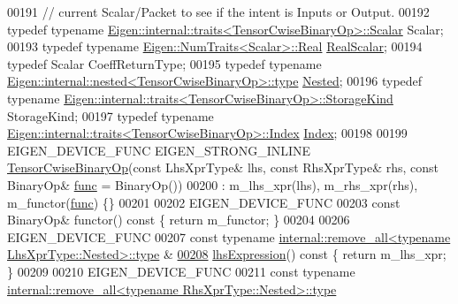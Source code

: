 \begin{DoxyCode}
00191     \textcolor{comment}{// current Scalar/Packet to see if the intent is Inputs or Output.}
00192     \textcolor{keyword}{typedef} \textcolor{keyword}{typename} \hyperlink{struct_eigen_1_1internal_1_1traits}{Eigen::internal::traits<TensorCwiseBinaryOp>::Scalar}
       Scalar;
00193     \textcolor{keyword}{typedef} \textcolor{keyword}{typename} \hyperlink{group___sparse_core___module}{Eigen::NumTraits<Scalar>::Real} 
      \hyperlink{group___sparse_core___module}{RealScalar};
00194     \textcolor{keyword}{typedef} Scalar CoeffReturnType;
00195     \textcolor{keyword}{typedef} \textcolor{keyword}{typename} \hyperlink{class_eigen_1_1internal_1_1_tensor_lazy_evaluator_writable}{Eigen::internal::nested<TensorCwiseBinaryOp>::type}
       \hyperlink{class_eigen_1_1internal_1_1_tensor_lazy_evaluator_writable}{Nested};
00196     \textcolor{keyword}{typedef} \textcolor{keyword}{typename} \hyperlink{struct_eigen_1_1internal_1_1traits}{Eigen::internal::traits<TensorCwiseBinaryOp>::StorageKind}
       StorageKind;
00197     \textcolor{keyword}{typedef} \textcolor{keyword}{typename} \hyperlink{struct_eigen_1_1internal_1_1traits}{Eigen::internal::traits<TensorCwiseBinaryOp>::Index}
       \hyperlink{namespace_eigen_a62e77e0933482dafde8fe197d9a2cfde}{Index};
00198 
00199     EIGEN\_DEVICE\_FUNC EIGEN\_STRONG\_INLINE \hyperlink{class_eigen_1_1_tensor_cwise_binary_op}{TensorCwiseBinaryOp}(\textcolor{keyword}{const} LhsXprType& lhs, \textcolor{keyword}{
      const} RhsXprType& rhs, \textcolor{keyword}{const} BinaryOp& \hyperlink{structfunc}{func} = BinaryOp())
00200         : m\_lhs\_xpr(lhs), m\_rhs\_xpr(rhs), m\_functor(\hyperlink{structfunc}{func}) \{\}
00201 
00202     EIGEN\_DEVICE\_FUNC
00203     \textcolor{keyword}{const} BinaryOp& functor()\textcolor{keyword}{ const }\{ \textcolor{keywordflow}{return} m\_functor; \}
00204 
00206     EIGEN\_DEVICE\_FUNC
00207     \textcolor{keyword}{const} \textcolor{keyword}{typename} \hyperlink{group___sparse_core___module}{internal::remove\_all<typename LhsXprType::Nested>::type}
      &
\hyperlink{class_eigen_1_1_tensor_cwise_binary_op_abe293a3a1ee663b55c0363d2fb751397}{00208}     \hyperlink{class_eigen_1_1_tensor_cwise_binary_op_abe293a3a1ee663b55c0363d2fb751397}{lhsExpression}()\textcolor{keyword}{ const }\{ \textcolor{keywordflow}{return} m\_lhs\_xpr; \}
00209 
00210     EIGEN\_DEVICE\_FUNC
00211     \textcolor{keyword}{const} \textcolor{keyword}{typename} \hyperlink{group___sparse_core___module}{internal::remove\_all<typename RhsXprType::Nested>::type}

\end{DoxyCode}
